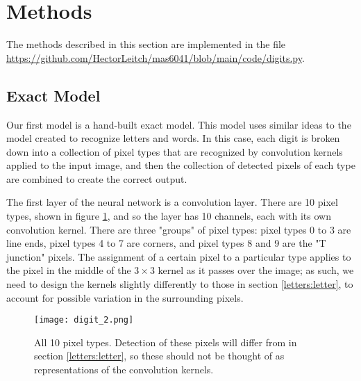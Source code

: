 \documentclass{somasmsc}
\begin{document}
\section{Methods}

The methods described in this section are implemented in the file \url{https://github.com/HectorLeitch/mas6041/blob/main/code/digits.py}.

\subsection{Exact Model}

Our first model is a hand-built exact model. This model uses similar ideas to the model created to recognize letters and words. In this case, each digit is broken down into a collection of pixel types that are recognized by convolution kernels applied to the input image, and then the collection of detected pixels of each type are combined to create the correct output.

The first layer of the neural network is a convolution layer. There are 10 pixel types, shown in figure \ref{digit:fig2}, and so the layer has 10 channels, each with its own convolution kernel. There are three "groups" of pixel types: pixel types 0 to 3 are line ends, pixel types 4 to 7 are corners, and pixel types 8 and 9 are the "T junction" pixels. The assignment of a certain pixel to a particular type applies to the pixel in the middle of the $3 \times 3$ kernel as it passes over the image; as such, we need to design the kernels slightly differently to those in section \ref{letters:letter}, to account for possible variation in the surrounding pixels.

\begin{figure}[H]\label{digit:fig2}
\begin{center}
\texttt{[image: digit\_2.png]}
\end{center}
\caption{All 10 pixel types. Detection of these pixels will differ from in section \ref{letters:letter}, so these should not be thought of as representations of the convolution kernels.}
\end{figure}
\end{document}

